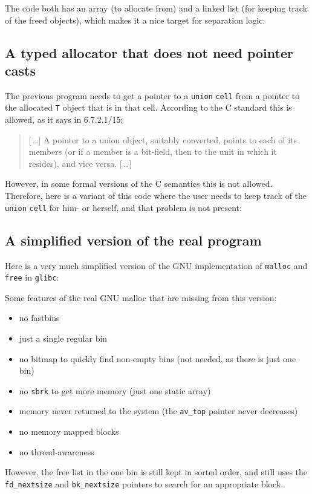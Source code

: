 \documentclass{article}
\begin{document}
The code both has an array (to allocate from) and a linked list (for keeping
track of the freed objects), which makes it a nice target for separation logic:


\subsection{A typed allocator that does not need pointer casts}
The previous program needs to get a pointer to a \texttt{union} \texttt{cell}
from a pointer to the allocated \texttt{T} object that is in that cell.
According to the C standard \cite{iso:11} this is allowed, as it says in 6.7.2.1/15:
\begin{quote}
[\,\dots]
A pointer to a union object, suitably converted,
points to each of its members (or if a member is a
bit-field, then to the unit in which it resides), and
vice versa.
[\,\dots]
\end{quote}
However, in some formal versions of the C semantics \cite{kre:16} this is not allowed.
Therefore, here is a variant of this code where the user needs to keep
track of the \texttt{union} \texttt{cell} for him- or herself,
and that problem is not present:


\subsection{A simplified version of the real program}
Here is a very much simplified version of the GNU implementation of \texttt{malloc} and \texttt{free} in \texttt{glibc}:

Some features of the real GNU malloc that are missing from this version:
\begin{itemize}
\item no fastbins
\item just a single regular bin
\item no bitmap to quickly find non-empty bins (not needed, as there is just one bin)
\item no \texttt{sbrk} to get more memory (just one static array)
\item memory never returned to the system (the \lstinline|av_top| pointer never decreases)
\item no memory mapped blocks
\item no thread-awareness
\end{itemize}
However, the free list in the one bin is still kept in sorted order, and still uses
the \lstinline|fd_nextsize| and \lstinline|bk_nextsize| pointers to search
for an appropriate block.
\end{document}
